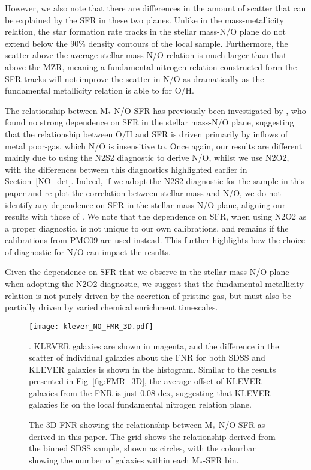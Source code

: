\documentclass[usenatbib]{mnras} %
\begin{document}
However, we also note that there are differences in the amount of scatter that can be explained by the SFR in these two planes. Unlike in the mass-metallicity relation, the star formation rate tracks in the stellar mass-N/O plane do not extend below the 90\% density contours of the local sample. Furthermore, the scatter above the average stellar mass-N/O relation is much larger than that above the MZR, meaning a fundamental nitrogen relation constructed form the SFR tracks will not improve the scatter in N/O as dramatically as the fundamental metallicity relation is able to for O/H. 

The relationship between M$_*$-N/O-SFR has previously been investigated by \cite{Perez-Montero_2013}, who found no strong dependence on SFR in the stellar mass-N/O plane, suggesting that the relationship between O/H and SFR is driven primarily by inflows of metal poor-gas, which N/O is insensitive to. Once again, our results are different mainly due to \cite{Perez-Montero_2013} using the N2S2 diagnostic to derive N/O, whilst we use N2O2, with the differences between this diagnostics highlighted earlier in Section~\ref{NO_det}. Indeed, if we adopt the N2S2 diagnostic for the sample in this paper and re-plot the correlation between stellar mass and N/O, we do not identify any dependence on SFR in the stellar mass-N/O plane, aligning our results with those of \cite{Perez-Montero_2013}. We note that the dependence on SFR, when using N2O2 as a proper diagnostic, is not unique to our own calibrations, and remains if the calibrations from PMC09 are used instead. This further highlights how the choice of diagnostic for N/O can impact the results.

Given the dependence on SFR that we observe in the stellar mass-N/O plane when adopting the N2O2 diagnostic, we suggest that the fundamental metallicity relation is not purely driven by the accretion of pristine gas, but must also be partially driven by varied chemical enrichment timescales. 


\begin{figure*}
    \centering
    \texttt{[image: klever\_NO\_FMR\_3D.pdf]} \par
    \caption{The 3D FNR showing the relationship between M$_*$-N/O-SFR as derived in this paper. The grid shows the relationship derived from the binned SDSS sample, shown as circles, with the colourbar showing the number of galaxies within each M$_*$-SFR bin.}. KLEVER galaxies are shown in magenta, and the difference in the scatter of individual galaxies about the FNR for both SDSS and KLEVER galaxies is shown in the histogram. Similar to the results presented in Fig~\ref{fig:FMR_3D}, the average offset of KLEVER galaxies from the FNR is just 0.08 dex, suggesting that KLEVER galaxies lie on the local fundamental nitrogen relation plane.
    \label{fig:FNR_3D}
\end{figure*}
\end{document}
